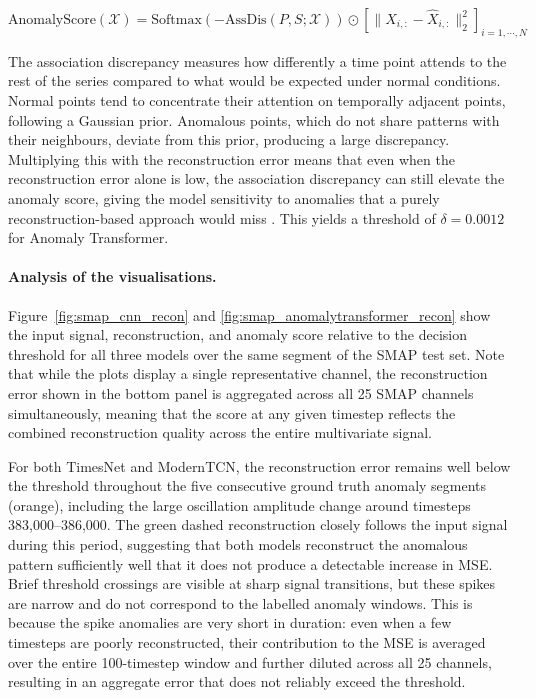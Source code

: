 \documentclass[twoside,11pt,openright]{report}
\begin{document}
\begin{equation}
    \text{AnomalyScore}(\mathcal{X}) = \text{Softmax}(-\text{AssDis}(P, S; 
    \mathcal{X})) \odot \left[\|X_{i,:} - \hat{X}_{i,:}\|_2^2\right]_{i=1,\cdots,N}
    \label{eq:anomaly_transformer_score}
\end{equation}

The association discrepancy measures how differently a time point attends to the 
rest of the series compared to what would be expected under normal conditions. 
Normal points tend to concentrate their attention on temporally adjacent points, 
following a Gaussian prior. Anomalous points, which do not share patterns with 
their neighbours, deviate from this prior, producing a large discrepancy. 
Multiplying this with the reconstruction error means that even when the 
reconstruction error alone is low, the association discrepancy can still elevate 
the anomaly score, giving the model sensitivity to anomalies that a purely 
reconstruction-based approach would miss \citep{anomalytransformer2022}. 
This yields a threshold of $\delta = 0.0012$ for Anomaly Transformer.

\paragraph{Analysis of the visualisations.}
Figure~\ref{fig:smap_cnn_recon} and 
\ref{fig:smap_anomalytransformer_recon} show the input signal, reconstruction, 
and anomaly score relative to the decision threshold for all three models over 
the same segment of the SMAP test set. Note that while the plots display a single 
representative channel, the reconstruction error shown in the bottom panel is 
aggregated across all 25 SMAP channels simultaneously, meaning that the score 
at any given timestep reflects the combined reconstruction quality across the 
entire multivariate signal.

For both TimesNet and ModernTCN, the reconstruction error remains well below 
the threshold throughout the five consecutive ground truth anomaly segments 
(orange), including the large oscillation amplitude change around timesteps 
383,000--386,000. The green dashed reconstruction closely follows the input 
signal during this period, suggesting that both models reconstruct the anomalous 
pattern sufficiently well that it does not produce a detectable increase in MSE. 
Brief threshold crossings are visible at sharp signal transitions, 
but these spikes are narrow and do not correspond 
to the labelled anomaly windows. This is because the spike anomalies are very 
short in duration: even when a few timesteps are poorly reconstructed, their 
contribution to the MSE is averaged over the entire 100-timestep window and 
further diluted across all 25 channels, resulting in an aggregate error that 
does not reliably exceed the threshold.
\end{document}
